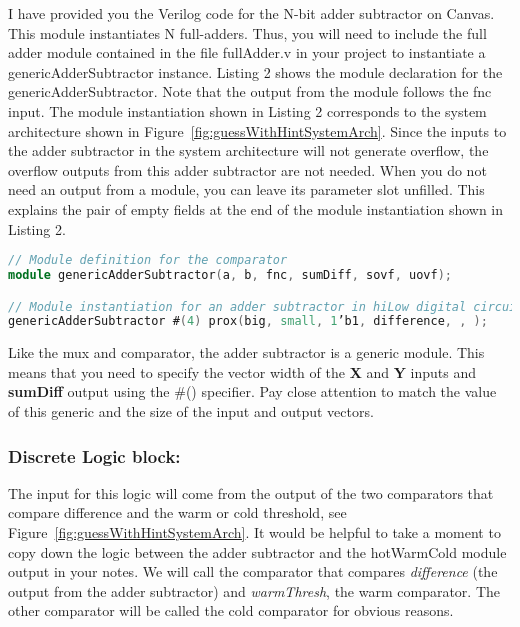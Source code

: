 I have provided you the Verilog code for the N-bit adder subtractor on
Canvas. This module instantiates N full-adders. Thus, you will need to
include the full adder module contained in the file fullAdder.v in your
project to instantiate a genericAdderSubtractor instance. Listing 2
shows the module declaration for the genericAdderSubtractor. Note that
the output from the module follows the fnc input. The module
instantiation shown in Listing 2 corresponds to the system architecture
shown in Figure~\ref{fig:guessWithHintSystemArch}. Since the inputs to the adder subtractor in the
system architecture will not generate overflow, the overflow outputs
from this adder subtractor are not needed. When you do not need an
output from a module, you can leave its parameter slot unfilled. This
explains the pair of empty fields at the end of the module instantiation
shown in Listing 2.

\begin{lstlisting}[language=Verilog,
 caption={Top, module definition for a 2:1 mux.  Bottom, module instantation 
 of a 2:1 mux in Figure~\ref{fig:guessGameSysArch}.},
 label={listing:2x1muxVerilog},
 frame=single]
// Module definition for the comparator
module genericAdderSubtractor(a, b, fnc, sumDiff, sovf, uovf);

// Module instantiation for an adder subtractor in hiLow digital circuit
genericAdderSubtractor #(4) prox(big, small, 1’b1, difference, , );
\end{lstlisting}


Like the mux and comparator, the adder subtractor is a generic module.
This means that you need to specify the vector width of the \textbf{X}
and \textbf{Y} inputs and \textbf{sumDiff} output using the \#()
specifier. Pay close attention to match the value of this generic and
the size of the input and output vectors.

\hypertarget{discrete-logic-block}{%
\subsubsection{Discrete Logic block:}
\label{discrete-logic-block}}

The input for this logic will come from the output of the two
comparators that compare difference and the warm or cold threshold, see
Figure~\ref{fig:guessWithHintSystemArch}. It would be helpful to take a moment to copy down the logic
between the adder subtractor and the hotWarmCold module output in your
notes. We will call the comparator that compares \emph{difference} (the
output from the adder subtractor) and \emph{warmThresh}, the warm
comparator. The other comparator will be called the cold comparator for
obvious reasons.

